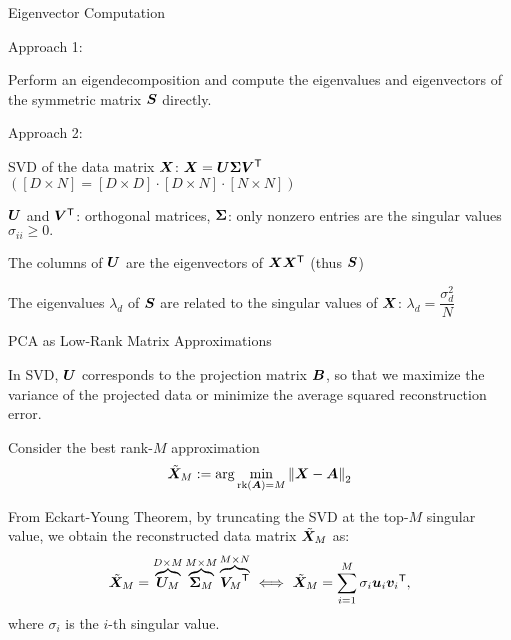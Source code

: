\documentclass[handout,fleqn,aspectratio=169]{beamer}
\begin{document}
\begin{frame}{Eigenvector Computation}

\plitemsep 0.1in

\bci



\item Approach 1:  \hfill {}
\bci
\item Perform an eigendecomposition and compute the eigenvalues and eigenvectors of the symmetric matrix $\bm{S}$ directly. 
\eci

\item Approach 2:  \hfill {}
\bci
\item SVD of the data matrix $\bm{X}$: $\bm{X} = \bm{U} \bm{\Sigma} {\bm{V}}^{\mathsf{T}}$ $([D\times N] = [D \times D]\cdot [D \times N] \cdot [N \times N])$
\item $\bm{U}$ and ${\bm{V}}^{\mathsf{T}}$: orthogonal matrices, $\bm{\Sigma}$: only nonzero entries are the singular values $\sigma_{ii} \geq 0.$
\item The columns of $\bm{U}$ are the eigenvectors of $\bm{X}{\bm{X}}^{\mathsf{T}}$ (thus $\bm{S}$)

\item The eigenvalues $\lambda_d$ of $\bm{S}$ are related to the singular values of $\bm{X}$: 
$\lambda_d = \dfrac{\sigma_d^2}{N}$
\eci
\eci
\end{frame}

\begin{frame}{PCA as Low-Rank Matrix Approximations}

\plitemsep 0.1in

\bci

\item In SVD, $\bm{U}$ corresponds to the projection matrix $\bm{B}$, so that we  maximize the variance of the projected data or minimize the average squared reconstruction error. 


\item Consider the best rank-$M$ approximation
$$
\tilde{\bm{X}}_M := \arg \min_{\text{rk}(\bm{A}) = M} \left \lVert \bm{X} - \bm{A} \right \rVert_2
$$

\item From Eckart-Young Theorem, by truncating the SVD at the top-$M$ singular value, we obtain the reconstructed data matrix $\tilde{\bm{X}}_M$ as: \hfill {}
$$
\tilde{\bm{X}}_M = \overbrace{\bm{U}_M}^{D \times M} \overbrace{\bm{\Sigma}_M }^{M \times M} \overbrace{{\bm{V}_M}^{\mathsf{T}}}^{M \times N} \ \Longleftrightarrow \ \tilde{\bm{X}}_M = \sum_{i=1}^M \sigma_i \bm{u}_i {\bm{v}_i}^{\mathsf{T}},
$$
where $\sigma_i$ is the $i$-th singular value. 
\eci
\end{frame}
\end{document}
